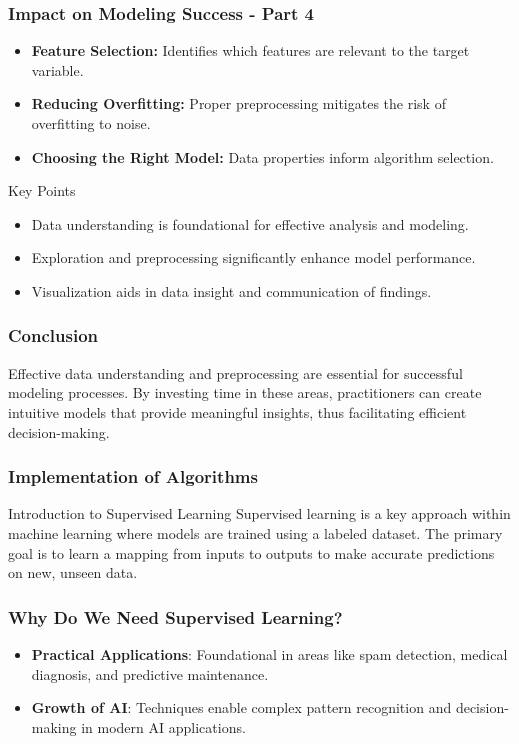\documentclass[aspectratio=169]{beamer}
\begin{document}
\begin{frame}[fragile]
    \frametitle{Impact on Modeling Success - Part 4}
    \begin{itemize}
        \item \textbf{Feature Selection:} Identifies which features are relevant to the target variable.
        \item \textbf{Reducing Overfitting:} Proper preprocessing mitigates the risk of overfitting to noise.
        \item \textbf{Choosing the Right Model:} Data properties inform algorithm selection.
    \end{itemize}
    \begin{block}{Key Points}
        \begin{itemize}
            \item Data understanding is foundational for effective analysis and modeling.
            \item Exploration and preprocessing significantly enhance model performance.
            \item Visualization aids in data insight and communication of findings.
        \end{itemize}
    \end{block}
\end{frame}

\begin{frame}[fragile]
    \frametitle{Conclusion}
    Effective data understanding and preprocessing are essential for successful modeling processes. 
    By investing time in these areas, practitioners can create intuitive models that provide meaningful insights, thus facilitating efficient decision-making.
\end{frame}

\begin{frame}[fragile]
    \frametitle{Implementation of Algorithms}
    \begin{block}{Introduction to Supervised Learning}
        Supervised learning is a key approach within machine learning where models are trained using a labeled dataset. The primary goal is to learn a mapping from inputs to outputs to make accurate predictions on new, unseen data.
    \end{block}
\end{frame}

\begin{frame}[fragile]
    \frametitle{Why Do We Need Supervised Learning?}
    \begin{itemize}
        \item \textbf{Practical Applications}: Foundational in areas like spam detection, medical diagnosis, and predictive maintenance.
        \item \textbf{Growth of AI}: Techniques enable complex pattern recognition and decision-making in modern AI applications.
    \end{itemize}
\end{frame}
\end{document}
